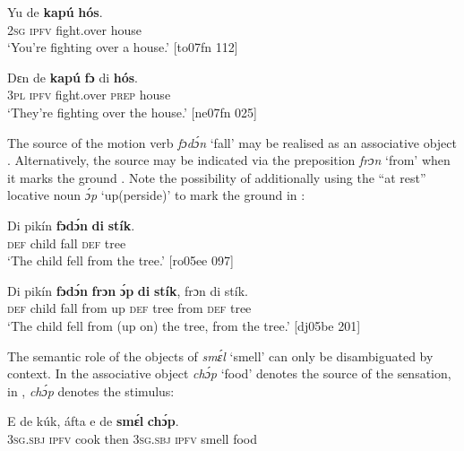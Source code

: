 \ea%
    \label{ex:key:1181}
    \gll Yu  de  \textbf{kapú}    \textbf{hós}.\\
\textsc{2sg}  \textsc{ipfv}  fight.over  house\\

\glt ‘You’re fighting over a house.’ [to07fn 112]
\z


\ea%
    \label{ex:key:1182}
    \gll Dɛn  de  \textbf{kapú}    \textbf{fɔ} di  \textbf{hós}.\\
\textsc{3pl}  \textsc{ipfv}  fight.over  \textsc{prep}    house\\

\glt ‘They’re fighting over the house.’ [ne07fn 025]
\z

The source\is{} of the motion verb \textit{fɔdɔ́n} ‘fall’ may be realised as an associative object . Alternatively, the source may be indicated via the preposition \textit{frɔn} ‘from’ when it marks the ground . Note the possibility of additionally using the “at rest” locative noun \textit{ɔ́p} ‘up(perside)’ to mark the ground in :


\ea%
    \label{ex:key:1183}
    \gll Di  pikín  \textbf{fɔdɔ́n}  \textbf{di}  \textbf{stík}.\\
\textsc{def}  child  fall    \textsc{def}  tree\\

\glt ‘The child fell from the tree.’ [ro05ee 097]
\z


\ea%
    \label{ex:key:1184}
    \gll Di  pikín  \textbf{fɔdɔ́n}  \textbf{frɔn}    \textbf{ɔ́p}  \textbf{di}  \textbf{stík},    frɔn    di  stík.\\
\textsc{def}  child  fall    from  up  \textsc{def}  tree    from  \textsc{def}  tree\\

\glt ‘The child fell from (up on) the tree, from the tree.’ [dj05be 201]
\z

The semantic role of the objects of \textit{smɛ́l} ‘smell’ can only be disambiguated by context. In  the associative object \textit{chɔ́p} ‘food’ denotes the source of the sensation, in , \textit{chɔ́p} denotes the stimulus{\fff}: 


\ea%
    \label{ex:key:1185}
    \gll E    de  kúk,    áfta    e    de  \textbf{smɛ́l}  \textbf{chɔ́p}.\\
\textsc{3sg.sbj}  \textsc{ipfv}  cook  then  \textsc{3sg.sbj}  \textsc{ipfv}  smell  food\\

